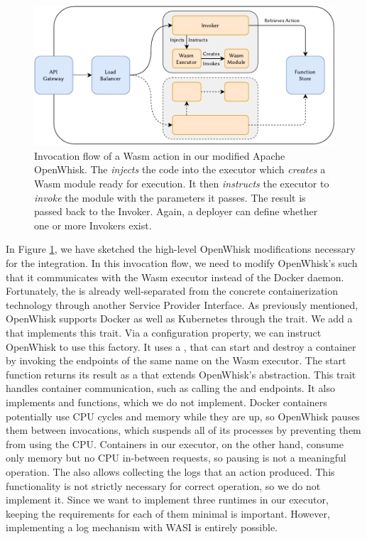 \begin{figure}
    \centering
    \includegraphics[width=\textwidth]{figures/WasmOpenWhiskActionInvocationFlow.pdf}
    \caption{Invocation flow of a Wasm action in our modified Apache OpenWhisk. The  \emph{injects} the code into the executor which \emph{creates} a Wasm module ready for execution. It then \emph{instructs} the executor to \emph{invoke} the module with the parameters it passes. The result is passed back to the Invoker. Again, a deployer can define whether one or more Invokers exist.}
    \label{fig:wasm-openwhisk-action-invocation-flow}
\end{figure}

In Figure \ref{fig:wasm-openwhisk-action-invocation-flow}, we have sketched the high-level OpenWhisk modifications necessary for the integration. In this invocation flow, we need to modify OpenWhisk's  such that it communicates with the Wasm executor instead of the Docker daemon. Fortunately, the  is already well-separated from the concrete containerization technology through another Service Provider Interface. As previously mentioned, OpenWhisk supports Docker as well as Kubernetes through the  trait. We add a  that implements this trait. Via a configuration property, we can instruct OpenWhisk to use this factory. It uses a , that can start and destroy a container by invoking the endpoints of the same name on the Wasm executor. The start function returns its result as a  that extends OpenWhisk's  abstraction. This trait handles container communication, such as calling the  and  endpoints. It also implements  and  functions, which we do not implement. Docker containers potentially use CPU cycles and memory while they are up, so OpenWhisk pauses them between invocations, which suspends all of its processes by preventing them from using the CPU. Containers in our executor, on the other hand, consume only memory but no CPU in-between requests, so pausing is not a meaningful operation. The  also allows collecting the logs that an action produced. This functionality is not strictly necessary for correct operation, so we do not implement it. Since we want to implement three runtimes in our executor, keeping the requirements for each of them minimal is important. However, implementing a log mechanism with WASI is entirely possible.

